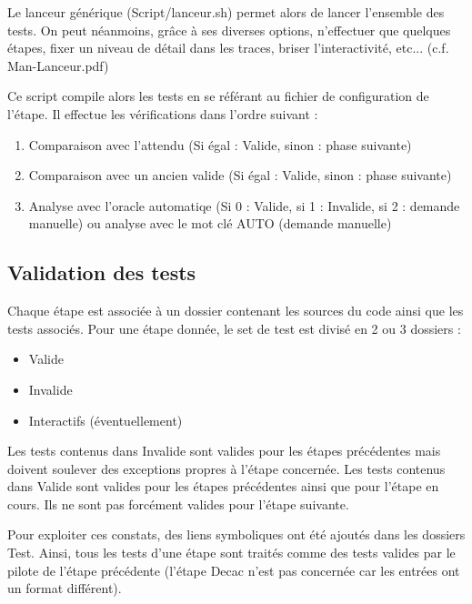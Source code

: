 \documentclass[11pt]{article}
\begin{document}
\hspace{1cm} Le lanceur générique (Script/lanceur.sh) permet alors de lancer l'ensemble des tests.
On peut néanmoins, grâce à ses diverses options, n'effectuer que quelques étapes, fixer un niveau de détail dans les traces, briser l'interactivité, etc... (c.f. Man-Lanceur.pdf)

\hspace{1cm} Ce script compile alors les tests en se référant au fichier de configuration de l'étape. Il effectue les vérifications dans l'ordre suivant : 
\begin{enumerate}
\item Comparaison avec l'attendu (Si égal : Valide, sinon : phase suivante)
\item Comparaison avec un ancien valide (Si égal : Valide, sinon : phase suivante)
\item Analyse avec l'oracle automatiqe (Si 0 : Valide, si 1 : Invalide, si 2 : demande manuelle)
ou analyse avec le mot clé AUTO (demande manuelle)
\end{enumerate}



\subsection{Validation des tests}
Chaque étape est associée à un dossier contenant les sources du code ainsi que les tests associés.
Pour une étape donnée, le set de test est divisé en 2 ou 3 dossiers :
\begin{itemize}
\item Valide
\item Invalide
\item Interactifs (éventuellement)
\end{itemize}

Les tests contenus dans Invalide sont valides pour les étapes précédentes mais doivent soulever des exceptions propres à l'étape concernée.
Les tests contenus dans Valide sont valides pour les étapes précédentes ainsi que pour l'étape en cours. Ils ne sont pas forcément valides pour l'étape suivante.

Pour exploiter ces constats, des liens symboliques ont été ajoutés dans les dossiers Test. Ainsi, tous les tests d'une étape sont traités comme des tests valides par le pilote de l'étape précédente (l'étape Decac n'est pas concernée car les entrées ont un format différent).
\end{document}
